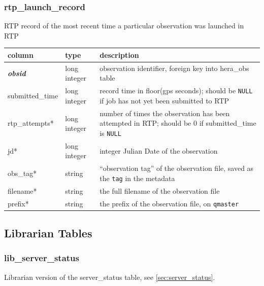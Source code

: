 \documentclass{article}
\begin{document}
{\subsubsection{rtp\_launch\_record}
RTP record of the most recent time a particular observation was launched in RTP
\begin{center}
  \begin{tabular}{| p{4cm} | p{2cm} | p{10cm} |}
    \hline
    column & type & description \\ [0.5ex] \hline\hline
    \textit{\textbf{obsid}} & long integer & observation identifier, foreign key into hera\_obs table \\ \hline
    submitted\_time & long integer & record time in floor(gps seconds); should be \verb+NULL+ if job has not yet been submitted to RTP \\ \hline
    rtp\_attempts* & long integer & number of times the observation has been attempted in RTP; should be 0 if submitted\_time is \verb+NULL+ \\ \hline
    jd* & long integer & integer Julian Date of the observation \\ \hline
    obs\_tag* & string & ``observation tag'' of the observation file, saved as the \verb+tag+ in the metadata \\ \hline
    filename* & string & the full filename of the observation file \\ \hline
    prefix* & string & the prefix of the observation file, on \verb+qmaster+ \\ \hline
  \end{tabular}
\end{center}


\subsection{Librarian Tables}
\subsubsection{lib\_server\_status}
Librarian version of the server\_status table, see \ref{sec:server_status}.

}
\end{document}
